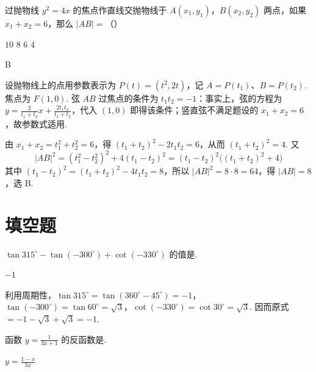 \documentclass[UTF8,a4paper,oneside,11pt]{ctexbook}
\begin{document}
\begin{problem}
过抛物线 \(y^2=4x\) 的焦点作直线交抛物线于 \(A(x_1,y_1)\)，\(B(x_2,y_2)\) 两点，如果 \(x_1+x_2=6\)，那么 \(|AB|=\)（\quad）

\choices
    {\(10\)}
    {\(8\)}
    {\(6\)}
    {\(4\)}
\end{problem}

\begin{answer}
B
\end{answer}

\begin{solution}
设抛物线上的点用参数表示为 \(P(t)=(t^2,2t)\)，记 \(A=P(t_1)\)、\(B=P(t_2)\). 焦点为 \(F(1,0)\). 弦 \(AB\) 过焦点的条件为 \(t_1t_2=-1\)：事实上，弦的方程为 \(y=\frac{2}{t_1+t_2}x+\frac{2t_1t_2}{t_1+t_2}\)，代入 \((1,0)\) 即得该条件；竖直弦不满足题设的 \(x_1+x_2=6\)，故参数式适用.

由 \(x_1+x_2=t_1^2+t_2^2=6\)，得 \((t_1+t_2)^2-2t_1t_2=6\)，从而 \((t_1+t_2)^2=4\). 又
\[
|AB|^2=(t_1^2-t_2^2)^2+4(t_1-t_2)^2=(t_1-t_2)^2\bigl((t_1+t_2)^2+4\bigr)
\]
其中 \((t_1-t_2)^2=(t_1+t_2)^2-4t_1t_2=8\)，所以 \(|AB|^2=8\cdot8=64\)，得 \(|AB|=8\)，选 B.
\end{solution}

\section{填空题}

\begin{problem}

\(\tan 315^\circ - \tan(-300^\circ) + \cot(-330^\circ)\) 的值是\fillinblank{}.
\end{problem}

\begin{answer}
\(-1\)
\end{answer}

\begin{solution}
利用周期性，\(\tan315^\circ=\tan(360^\circ-45^\circ)=-1\)，\(\tan(-300^\circ)=\tan60^\circ=\sqrt3\)，\(\cot(-330^\circ)=\cot30^\circ=\sqrt3\). 因而原式 \(=-1-\sqrt3+\sqrt3=-1\).
\end{solution}

\begin{problem}

函数 \(y = \frac{1}{3x + 1}\) 的反函数是\fillinblank{}.
\end{problem}

\begin{answer}
\(y = \frac{1 - x}{3x}\)
\end{answer}
\end{document}
